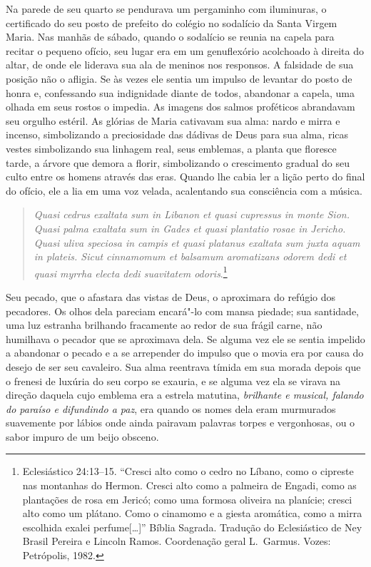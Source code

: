 Na parede de seu quarto se pendurava um pergaminho com iluminuras, o
certificado do seu posto de prefeito do colégio no sodalício da Santa
Virgem Maria. Nas manhãs de sábado, quando o sodalício se reunia na
capela para recitar o pequeno ofício, seu lugar era em um genuflexório
acolchoado à direita do altar, de onde ele liderava sua ala de meninos
nos responsos. A falsidade de sua posição não o afligia. Se às vezes
ele sentia um impulso de levantar do posto de honra e, confessando sua
indignidade diante de todos, abandonar a capela, uma olhada em seus
rostos o impedia. As imagens dos salmos proféticos abrandavam seu
orgulho estéril. As glórias de Maria cativavam sua alma: nardo e mirra
e incenso, simbolizando a preciosidade das dádivas de Deus para sua
alma, ricas vestes simbolizando sua linhagem real, seus emblemas, a
planta que floresce tarde, a árvore que demora a florir, simbolizando o
crescimento gradual do seu culto entre os homens através das eras.
Quando lhe cabia ler a lição perto do final do ofício, ele a lia em uma
voz velada, acalentando sua consciência com a música.

\begin{quote}
\textit{Quasi cedrus exaltata sum in Libanon et quasi cupressus in monte
Sion. Quasi palma exaltata sum in Gades et quasi plantatio rosae in
Jericho. Quasi uliva speciosa in campis et quasi platanus exaltata sum
juxta aquam in plateis. Sicut cinnamomum et balsamum aromatizans odorem
dedi et quasi myrrha electa dedi suavitatem odoris}.\footnote{ Eclesiástico 24:13--15. 
``Cresci alto como o cedro no Líbano, como o cipreste nas montanhas do Hermon.
Cresci alto como a palmeira de Engadi, como as plantações de rosa em Jericó; 
como uma formosa oliveira na planície; cresci alto como um plátano.
Como o cinamomo e a giesta aromática, como a mirra escolhida exalei perfume[\ldots{}]'' 
Bíblia Sagrada. Tradução do Eclesiástico de Ney Brasil Pereira e Lincoln Ramos. 
Coordenação geral L.~Garmus. Vozes: Petrópolis, 1982.}
\end{quote}

Seu pecado, que o afastara das vistas de Deus, o aproximara do refúgio
dos pecadores. Os olhos dela pareciam encará"-lo com mansa piedade; sua
santidade, uma luz estranha brilhando fracamente ao redor de sua frágil
carne, não humilhava o pecador que se aproximava dela. Se alguma vez
ele se sentia impelido a abandonar o pecado e a se arrepender do
impulso que o movia era por causa do desejo de ser seu cavaleiro. Sua
alma reentrava tímida em sua morada depois que o frenesi de luxúria do
seu corpo se exauria, e se alguma vez ela se virava na direção daquela
cujo emblema era a estrela matutina, \textit{brilhante e musical,
falando do paraíso e difundindo a paz}, era quando os nomes dela eram
murmurados suavemente por lábios onde ainda pairavam palavras torpes e
vergonhosas, ou o sabor impuro de um beijo obsceno.

